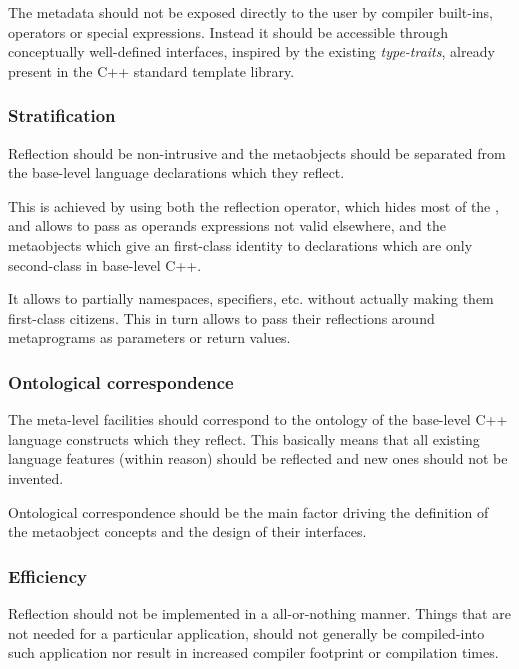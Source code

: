 The metadata should not be exposed directly
to the user by compiler built-ins, operators or special expressions.
Instead it should be accessible through conceptually well-defined interfaces,
inspired by the existing {\em type-traits}, already present in
the C++ standard template library.

\subsubsection{Stratification}
\label{design-stratification}

Reflection should be non-intrusive and the metaobjects should be separated
from the base-level language declarations which they reflect.

This is achieved by using both the reflection operator, which hides most of the
, and allows to pass as operands expressions not valid elsewhere,
and the metaobjects which give an first-class identity to declarations
which are only second-class in base-level C++.

It allows to partially  namespaces, specifiers, etc. without actually
making them first-class citizens. This in turn allows to pass their reflections around
metaprograms as parameters or return values.

\subsubsection{Ontological correspondence}
\label{design-onto-corr}

The meta-level facilities should
correspond to the ontology of the base-level C++ language constructs
which they reflect. This basically means that all existing language
features (within reason) should be reflected and new ones should not be invented.

Ontological correspondence should be the main factor driving the definition of the
metaobject concepts and the design of their interfaces.


\subsubsection{Efficiency}
\label{design-efficiency}

Reflection should not be implemented in a all-or-nothing manner.
Things that are not needed for a particular application,
should not generally be compiled-into such application nor result in
increased compiler footprint or compilation times.

